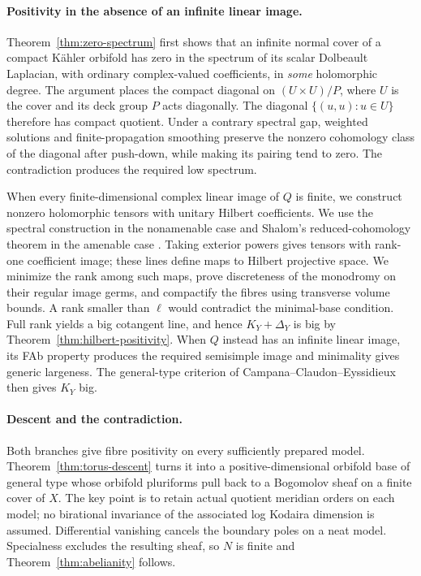 \paragraph{Positivity in the absence of an infinite linear image.}
Theorem~\ref{thm:zero-spectrum} first shows that an infinite normal
cover of a compact K\"ahler orbifold has zero in the spectrum of
its scalar Dolbeault Laplacian, with ordinary complex-valued
coefficients, in \emph{some} holomorphic degree.
The argument places the compact diagonal on
\((U\times U)/P\), where \(U\) is the cover and its deck
group \(P\) acts diagonally. The diagonal \(\{(u,u):u\in U\}\)
therefore has compact quotient. Under a contrary spectral gap, weighted solutions and
finite-propagation smoothing preserve the nonzero cohomology class
of the diagonal after push-down, while making its pairing tend to
zero. The contradiction produces the required low spectrum.

When every finite-dimensional complex linear image of \(Q\) is
finite, we construct nonzero holomorphic tensors with unitary Hilbert
coefficients. We use the spectral construction in the nonamenable
case and Shalom's reduced-cohomology theorem in the amenable case
\cite[Theorem~4.2]{Shalom2006}. Taking exterior powers gives tensors with rank-one coefficient
image; these lines define maps to Hilbert projective space. We minimize the rank among such
maps, prove discreteness of the monodromy on their regular image
germs, and compactify the fibres using transverse volume bounds.
A rank smaller than \(\ell\) would contradict the minimal-base
condition. Full rank yields a big cotangent line, and hence
\(K_Y+\Delta_Y\) is big by Theorem~\ref{thm:hilbert-positivity}.
When \(Q\) instead has an infinite linear image, its FAb property
produces the required semisimple image and minimality gives generic
largeness. The general-type criterion of
Campana--Claudon--Eyssidieux then gives \(K_Y\) big.

\paragraph{Descent and the contradiction.}
Both branches give fibre positivity on every sufficiently prepared
model. Theorem~\ref{thm:torus-descent} turns it into a
positive-dimensional orbifold base of general type whose orbifold
pluriforms pull back
to a Bogomolov sheaf on a finite cover of \(X\). The key point is
to retain actual quotient meridian orders on each model; no
birational invariance of the associated log Kodaira dimension is
assumed. Differential vanishing cancels the boundary poles on a
neat model. Specialness excludes the resulting sheaf, so \(N\)
is finite and Theorem~\ref{thm:abelianity} follows.

